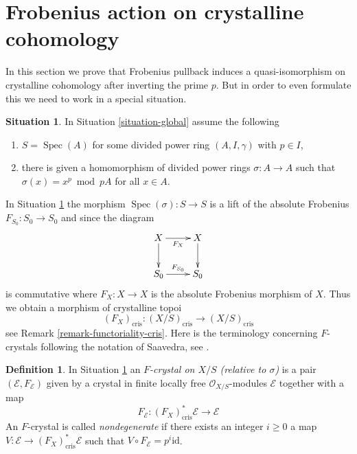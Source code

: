\documentclass{stacks-project}
\theoremstyle{plain}
\theoremstyle{definition}
\newtheorem{definition}[subsection]{Definition}
\newtheorem{situation}[subsection]{Situation}
\theoremstyle{remark}
\numberwithin{equation}{subsection}
\def\Spec{\mathop{\mathrm{Spec}}}
\begin{document}
\section{Frobenius action on crystalline cohomology}
\label{section-frobenius}

\noindent
In this section we prove that Frobenius pullback induces a quasi-isomorphism
on crystalline cohomology after inverting the prime $p$. But in order to
even formulate this we need to work in a special situation.

\begin{situation}
\label{situation-F-crystal}
In Situation \ref{situation-global} assume the following
\begin{enumerate}
\item $S = \Spec(A)$ for some divided power ring $(A, I, \gamma)$
with $p \in I$,
\item there is given a homomorphism of divided power rings $\sigma : A \to A$
such that $\sigma(x) = x^p \bmod pA$ for all $x \in A$.
\end{enumerate}
\end{situation}

\noindent
In Situation \ref{situation-F-crystal} the morphism
$\Spec(\sigma) : S \to S$ is a lift of the absolute Frobenius
$F_{S_0} : S_0 \to S_0$ and since the diagram
$$
\xymatrix{
X \ar[d] \ar[r]_{F_X} & X \ar[d] \\
S_0 \ar[r]^{F_{S_0}} & S_0
}
$$
is commutative where $F_X : X \to X$ is the absolute Frobenius morphism
of $X$. Thus we obtain a morphism of crystalline topoi
$$
(F_X)_{\text{cris}} :
(X/S)_{\text{cris}}
\longrightarrow
(X/S)_{\text{cris}}
$$
see Remark \ref{remark-functoriality-cris}. Here is the terminology concerning
$F$-crystals following the notation of Saavedra, see
\cite{Saavedra}.

\begin{definition}
\label{definition-F-crystal}
In Situation \ref{situation-F-crystal} an {\it $F$-crystal on $X/S$
(relative to $\sigma$)} is a pair $(\mathcal{E}, F_\mathcal{E})$
given by a crystal in finite locally free $\mathcal{O}_{X/S}$-modules
$\mathcal{E}$ together with a map
$$
F_\mathcal{E} : (F_X)_{\text{cris}}^*\mathcal{E} \longrightarrow \mathcal{E}
$$
An $F$-crystal is called {\it nondegenerate} if there exists an integer
$i \geq 0$ a map $V : \mathcal{E} \to (F_X)_{\text{cris}}^*\mathcal{E}$
such that $V \circ F_{\mathcal{E}} = p^i \text{id}$.
\end{definition}
\end{document}
